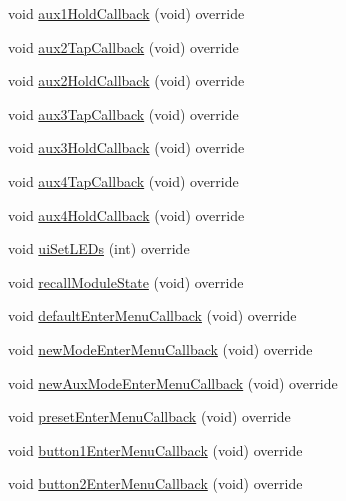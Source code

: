 \begin{DoxyCompactItemize}
void \mbox{\hyperlink{class_via_sync_1_1_via_sync_u_i_aaa66c2014e79270140575713998d67ae}{aux1\+Hold\+Callback}} (void) override
\item 
void \mbox{\hyperlink{class_via_sync_1_1_via_sync_u_i_a117e57feaf74b2619c1506aacc421721}{aux2\+Tap\+Callback}} (void) override
\item 
void \mbox{\hyperlink{class_via_sync_1_1_via_sync_u_i_af692a47db686fac2e929549217452258}{aux2\+Hold\+Callback}} (void) override
\item 
void \mbox{\hyperlink{class_via_sync_1_1_via_sync_u_i_afe95d77f17525a7e612485089a01ab0d}{aux3\+Tap\+Callback}} (void) override
\item 
void \mbox{\hyperlink{class_via_sync_1_1_via_sync_u_i_ae35a16d1e3a6158ffd306b06e93b16a4}{aux3\+Hold\+Callback}} (void) override
\item 
void \mbox{\hyperlink{class_via_sync_1_1_via_sync_u_i_a1cf7ef02457d9f7887da0721799aadc0}{aux4\+Tap\+Callback}} (void) override
\item 
void \mbox{\hyperlink{class_via_sync_1_1_via_sync_u_i_a15f48c7e1d5f77292ee46d997421cd4e}{aux4\+Hold\+Callback}} (void) override
\item 
void \mbox{\hyperlink{class_via_sync_1_1_via_sync_u_i_a694877fa6ee36aa11d9fbf3e249f95e5}{ui\+Set\+L\+E\+Ds}} (int) override
\item 
void \mbox{\hyperlink{class_via_sync_1_1_via_sync_u_i_a1a59cd903a2e11b698445b02c9fe5a48}{recall\+Module\+State}} (void) override
\item 
void \mbox{\hyperlink{class_via_sync_1_1_via_sync_u_i_a53dbd5157906ae81c3d54a56eafbf06e}{default\+Enter\+Menu\+Callback}} (void) override
\item 
void \mbox{\hyperlink{class_via_sync_1_1_via_sync_u_i_a553b539840029324ea43feb128f4b2c9}{new\+Mode\+Enter\+Menu\+Callback}} (void) override
\item 
void \mbox{\hyperlink{class_via_sync_1_1_via_sync_u_i_a842b231f8014209b4e96b3b8c06b16e1}{new\+Aux\+Mode\+Enter\+Menu\+Callback}} (void) override
\item 
void \mbox{\hyperlink{class_via_sync_1_1_via_sync_u_i_a390deaa64d96fa447720294817149dde}{preset\+Enter\+Menu\+Callback}} (void) override
\item 
void \mbox{\hyperlink{class_via_sync_1_1_via_sync_u_i_a2082d2d4a5ef8cbbaa2a1d8a387b3cad}{button1\+Enter\+Menu\+Callback}} (void) override
\item 
void \mbox{\hyperlink{class_via_sync_1_1_via_sync_u_i_a92bc4b1308d5994bef5989a8e975321d}{button2\+Enter\+Menu\+Callback}} (void) override

\end{DoxyCompactItemize}
